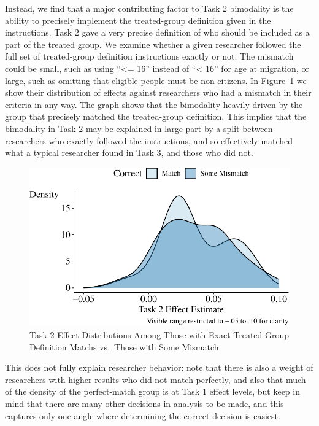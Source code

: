 \documentclass[
  letterpaper,
  DIV=11,
  numbers=noendperiod]{scrartcl}
\begin{document}
Instead, we find that a major contributing factor to Task 2 bimodality
is the ability to precisely implement the treated-group definition given
in the instructions. Task 2 gave a very precise definition of who should
be included as a part of the treated group. We examine whether a given
researcher followed the full set of treated-group definition
instructions exactly or not. The mismatch could be small, such as using
``\textless= 16'' instead of ``\textless{} 16'' for age at migration, or
large, such as omitting that eligible people must be non-citizens. In
Figure~\ref{fig-match-vs-mismatch} we show their distribution of effects
against researchers who had a mismatch in their criteria in any way. The
graph shows that the bimodality heavily driven by the group that
precisely matched the treated-group definition. This implies that the
bimodality in Task 2 may be explained in large part by a split between
researchers who exactly followed the instructions, and so effectively
matched what a typical researcher found in Task 3, and those who did
not.

\begin{figure}

{\centering \includegraphics{The-Sources-of-Researcher-Variation-in-Economics_files/figure-pdf/fig-match-vs-mismatch-1.pdf}

}

\caption{\label{fig-match-vs-mismatch}Task 2 Effect Distributions Among
Those with Exact Treated-Group Definition Matchs vs.~Those with Some
Mismatch}

\end{figure}

This does not fully explain researcher behavior: note that there is also
a weight of researchers with higher results who did not match perfectly,
and also that much of the density of the perfect-match group is at Task
1 effect levels, but keep in mind that there are many other decisions in
analysis to be made, and this captures only one angle where determining
the correct decision is easiest.
\end{document}
